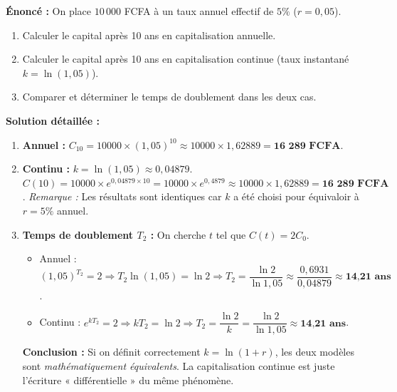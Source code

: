\documentclass[11pt]{article}
\begin{document}
\begin{exoresolu}
\textbf{Énoncé :} On place $10\,000$ FCFA à un taux annuel effectif de $5\%$ ($r=0,05$).
\begin{enumerate}
    \item Calculer le capital après 10 ans en capitalisation annuelle.
    \item Calculer le capital après 10 ans en capitalisation continue (taux instantané $k = \ln(1,05)$).
    \item Comparer et déterminer le temps de doublement dans les deux cas.
\end{enumerate}
\tcblower
\textbf{Solution détaillée :}
\begin{enumerate}
    \item \textbf{Annuel :} $C_{10} = 10000 \times (1,05)^{10} \approx 10000 \times 1,62889 = \textbf{16 289 FCFA}$.
    \item \textbf{Continu :} $k = \ln(1,05) \approx 0,04879$.
    $C(10) = 10000 \times e^{0,04879 \times 10} = 10000 \times e^{0,4879} \approx 10000 \times 1,62889 = \textbf{16 289 FCFA}$.
    \emph{Remarque :} Les résultats sont identiques car $k$ a été choisi pour équivaloir à $r=5\%$ annuel.
    \item \textbf{Temps de doublement $T_2$ :} On cherche $t$ tel que $C(t) = 2C_0$.
    \begin{itemize}
        \item Annuel : $(1,05)^{T_2} = 2 \Rightarrow T_2 \ln(1,05) = \ln 2 \Rightarrow T_2 = \dfrac{\ln 2}{\ln 1,05} \approx \dfrac{0,6931}{0,04879} \approx \textbf{14,21 ans}$.
        \item Continu : $e^{k T_2} = 2 \Rightarrow k T_2 = \ln 2 \Rightarrow T_2 = \dfrac{\ln 2}{k} = \dfrac{\ln 2}{\ln 1,05} \approx \textbf{14,21 ans}$.
    \end{itemize}
    \textbf{Conclusion :} Si on définit correctement $k = \ln(1+r)$, les deux modèles sont \emph{mathématiquement équivalents}. La capitalisation continue est juste l'écriture « différentielle » du même phénomène.
\end{enumerate}
\end{exoresolu}
\end{document}

